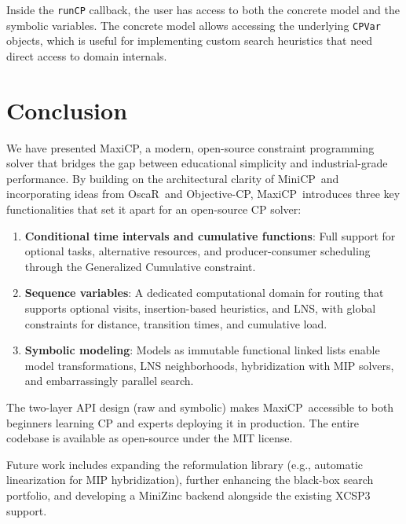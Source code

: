 \documentclass[11pt, a4paper]{scrartcl}
\newcommand{\maxicp}{\textsf{MaxiCP}}
\newcommand{\objectivecp}{\textsf{Objective-CP}}
\newcommand{\minicp}{\textsf{MiniCP}}
\newcommand{\oscar}{\textsf{OscaR}}
\begin{document}
Inside the \texttt{runCP} callback, the user has access to both the concrete model and the symbolic variables. The concrete model allows accessing the underlying \texttt{CPVar} objects, which is useful for implementing custom search heuristics that need direct access to domain internals.


\section{Conclusion}
\label{sec:conclusion}

We have presented \maxicp, a modern,
open-source constraint programming solver that bridges the gap
between educational simplicity and industrial-grade performance.
By building on the architectural clarity of \minicp\ and incorporating ideas from \oscar\ and \objectivecp,
\maxicp\ introduces three key functionalities that set it apart for an open-source CP solver:

\begin{enumerate}
    \item \textbf{Conditional time intervals and cumulative functions}: Full support for optional tasks, alternative resources, and producer-consumer scheduling through the Generalized Cumulative constraint.
    \item \textbf{Sequence variables}: A dedicated computational domain for routing that supports optional visits, insertion-based heuristics, and LNS, with global constraints for distance, transition times, and cumulative load.
    \item \textbf{Symbolic modeling}: Models as immutable functional linked lists enable model transformations, LNS neighborhoods, hybridization with MIP solvers, and embarrassingly parallel search.
\end{enumerate}

The two-layer API design (raw and symbolic) makes \maxicp\ accessible to both beginners learning CP and
experts deploying it in production. The entire codebase is available as open-source under the MIT license.

Future work includes expanding the reformulation library (e.g., automatic linearization for MIP hybridization),
further enhancing the black-box search portfolio,
and developing a MiniZinc backend alongside the existing XCSP3 support.



\end{document}
